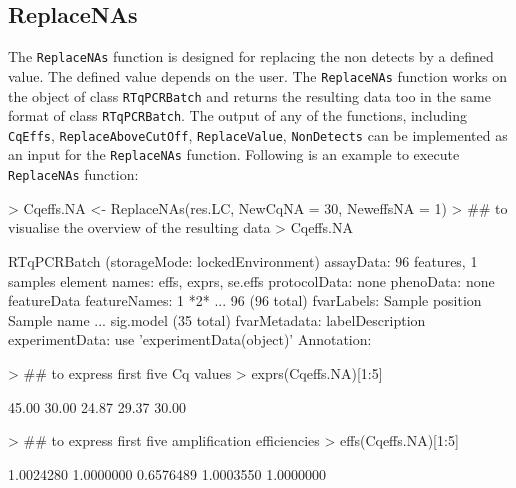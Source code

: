 \documentclass[11pt]{article}
\newcommand{\code}[1]{{\tt #1}}
\begin{document}
\subsection{ReplaceNAs} 
The \code{ReplaceNAs} function is designed for replacing the non detects by a defined value. The defined value depends on the user. The \code{ReplaceNAs} function works on the object of class \code{RTqPCRBatch} and returns the resulting data too in the same format of class \code{RTqPCRBatch}. The output of any of the functions, including \code{CqEffs}, \code{ReplaceAboveCutOff}, \code{ReplaceValue}, \code{NonDetects} can be implemented as an input for the \code{ReplaceNAs} function. Following is an example to execute \code{ReplaceNAs} function:


\begin{Schunk}
\begin{Sinput}
> Cqeffs.NA <- ReplaceNAs(res.LC, NewCqNA = 30, NeweffsNA = 1)
> ## to visualise the overview of the resulting data
> Cqeffs.NA 
\end{Sinput}
\begin{Soutput}
RTqPCRBatch (storageMode: lockedEnvironment)
assayData: 96 features, 1 samples 
  element names: effs, exprs, se.effs 
protocolData: none
phenoData: none
featureData
  featureNames: 1 *2* ... 96 (96 total)
  fvarLabels: Sample position Sample name ... sig.model (35 total)
  fvarMetadata: labelDescription
experimentData: use 'experimentData(object)'
Annotation:  
\end{Soutput}
\begin{Sinput}
> ## to express first five Cq values 
> exprs(Cqeffs.NA)[1:5]
\end{Sinput}
\begin{Soutput}
[1] 45.00 30.00 24.87 29.37 30.00
\end{Soutput}
\begin{Sinput}
> ## to express first five amplification efficiencies
> effs(Cqeffs.NA)[1:5] 
\end{Sinput}
\begin{Soutput}
[1] 1.0024280 1.0000000 0.6576489 1.0003550 1.0000000
\end{Soutput}
\end{Schunk}

\end{document}
